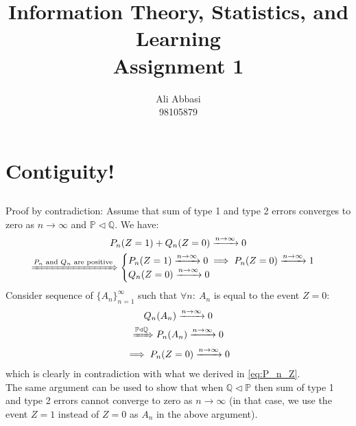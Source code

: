 \documentclass{article}
\title{Information Theory, Statistics, and Learning\\Assignment 1}
\author{Ali Abbasi\\ 98105879}
\numberwithin{equation}{section}
\begin{document}
\maketitle
\tableofcontents
\pagebreak

\section{Contiguity!}
\subsection{}
Proof by contradiction:
Assume that sum of type 1 and type 2 errors converges to zero as $n\rightarrow\infty$ and \(\mathbb{P} \triangleleft \mathbb{Q} \).
We have:
\begin{gather}
P_n(Z=1) + Q_n(Z=0) \xrightarrow{n \to \infty} 0\\
\xRightarrow{P_n \text{ and } Q_n \text{ are positive}}
\begin{cases}
P_n(Z=1) \xrightarrow{n \to \infty} 0 \implies P_n(Z=0) \xrightarrow{n \to \infty} 1\\
Q_n(Z=0) \xrightarrow{n \to \infty} 0
\end{cases}
\label{eq:P_n_Z}
\end{gather}
Consider sequence of \(\{A_n\}_{n=1}^\infty\) such that \(\forall n:\ A_n\) is equal to the event \(Z=0\):
\begin{gather}
Q_n(A_n) \xrightarrow{n \to \infty} 0\\
\xRightarrow{\mathbb{P} \triangleleft \mathbb{Q}} P_n(A_n) \xrightarrow{n \to \infty} 0\\
\implies P_n(Z=0) \xrightarrow{n \to \infty} 0
\end{gather}
which is clearly in contradiction with what we derived in \eqref{eq:P_n_Z}.\\
The same argument can be used to show that when \(\mathbb{Q} \triangleleft \mathbb{P}\) then sum of type 1 and type 2 errors cannot converge to zero as $n\rightarrow\infty$
(in that case, we use the event \(Z=1\) instead of \(Z=0\) as \( A_n\) in the above argument).
\end{document}
